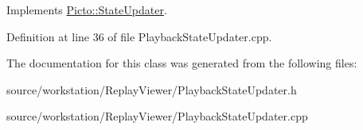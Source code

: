 Implements \hyperlink{class_picto_1_1_state_updater_a7554cc46eafbee58fb566edd93d5410e}{Picto\-::\-State\-Updater}.



Definition at line 36 of file Playback\-State\-Updater.\-cpp.



The documentation for this class was generated from the following files\-:\begin{DoxyCompactItemize}
\item 
source/workstation/\-Replay\-Viewer/Playback\-State\-Updater.\-h\item 
source/workstation/\-Replay\-Viewer/Playback\-State\-Updater.\-cpp\end{DoxyCompactItemize}
